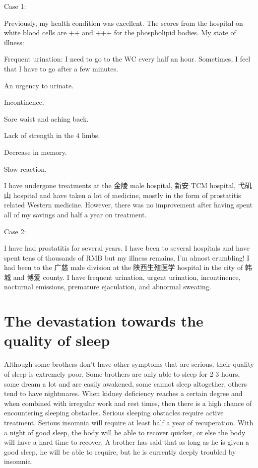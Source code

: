 \documentclass[
]{book}
\begin{document}
Case 1:

Previously, my health condition was excellent. The scores from the hospital on white blood cells are ++ and +++ for the phospholipid bodies. My state of illness:

Frequent urination: I need to go to the WC every half an hour. Sometimes, I feel that I have to go after a few minutes.

An urgency to urinate.

Incontinence.

Sore waist and aching back.

Lack of strength in the 4 limbs.

Decrease in memory.

Slow reaction.

I have undergone treatments at the 金陵 male hospital, 新安 TCM hospital, 弋矶山 hospital and have taken a lot of medicine, mostly in the form of prostatitis related Western medicine. However, there was no improvement after having spent all of my savings and half a year on treatment.

Case 2:

I have had prostatitis for several years. I have been to several hospitals and have spent tens of thousands of RMB but my illness remains, I'm almost crumbling! I had been to the 广慈 male division at the 陕西生殖医学 hospital in the city of 韩城 and 博爱 county. I have frequent urination, urgent urination, incontinence, nocturnal emissions, premature ejaculation, and abnormal sweating.

\hypertarget{the-devastation-towards-the-quality-of-sleep}{%
\section{The devastation towards the quality of sleep}\label{the-devastation-towards-the-quality-of-sleep}}

Although some brothers don't have other symptoms that are serious, their quality of sleep is extremely poor. Some brothers are only able to sleep for 2-3 hours, some dream a lot and are easily awakened, some cannot sleep altogether, others tend to have nightmares. When kidney deficiency reaches a certain degree and when combined with irregular work and rest times, then there is a high chance of encountering sleeping obstacles. Serious sleeping obstacles require active treatment. Serious insomnia will require at least half a year of recuperation. With a night of good sleep, the body will be able to recover quicker, or else the body will have a hard time to recover. A brother has said that as long as he is given a good sleep, he will be able to require, but he is currently deeply troubled by insomnia.
\end{document}
